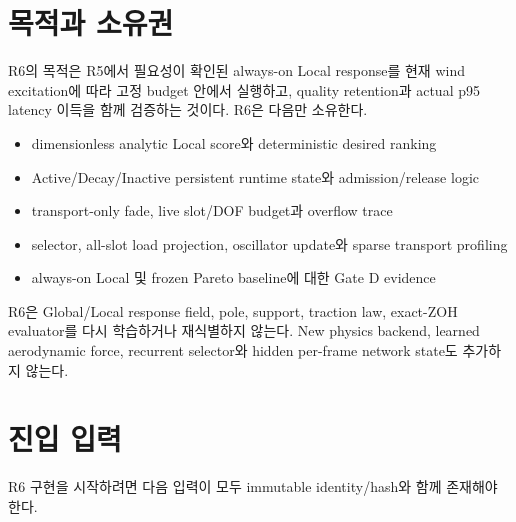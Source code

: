 \documentclass[10pt]{article}
\begin{document}
\tableofcontents
\newpage

\section{목적과 소유권}
\label{sec:r6-chapter-1}

R6의 목적은 R5에서 필요성이 확인된 always-on Local response를 현재 wind excitation에 따라
고정 budget 안에서 실행하고, quality retention과 actual p95 latency 이득을 함께 검증하는 것이다.
R6은 다음만 소유한다.

\begin{itemize}
  \item dimensionless analytic Local score와 deterministic desired ranking
  \item Active/Decay/Inactive persistent runtime state와 admission/release logic
  \item transport-only fade, live slot/DOF budget과 overflow trace
  \item selector, all-slot load projection, oscillator update와 sparse transport profiling
  \item always-on Local 및 frozen Pareto baseline에 대한 Gate D evidence
\end{itemize}

R6은 Global/Local response field, pole, support, traction law, exact-ZOH evaluator를 다시 학습하거나
재식별하지 않는다. New physics backend, learned aerodynamic force, recurrent selector와 hidden
per-frame network state도 추가하지 않는다.

\section{진입 입력}
\label{sec:r6-chapter-2}

R6 구현을 시작하려면 다음 입력이 모두 immutable identity/hash와 함께 존재해야 한다.
\end{document}
